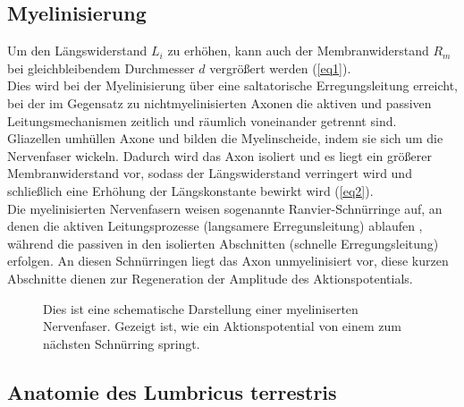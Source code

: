 \documentclass[11pt]{article}
\begin{document}
\subsection{Myelinisierung}
Um den Längswiderstand $L_i$ zu erhöhen, kann auch der Membranwiderstand $R_m$ bei gleichbleibendem Durchmesser $d$ vergrößert werden (\vref*{eq1}). \\
Dies wird bei der Myelinisierung über eine saltatorische Erregungsleitung erreicht, bei der im Gegensatz zu nichtmyelinisierten Axonen die aktiven und passiven Leitungsmechanismen zeitlich und räumlich voneinander getrennt sind. \\
Gliazellen umhüllen Axone und bilden die Myelinscheide, indem sie sich um die Nervenfaser wickeln. Dadurch wird das Axon isoliert und es liegt ein größerer Membranwiderstand vor, sodass der Längswiderstand verringert wird und schließlich eine Erhöhung der Längskonstante bewirkt wird (\vref*{eq2}). \\
Die myelinisierten Nervenfasern weisen sogenannte Ranvier-Schnürringe auf, an denen die aktiven Leitungsprozesse (langsamere Erregunsleitung) ablaufen , während die passiven in den isolierten Abschnitten (schnelle Erregungsleitung) erfolgen. An diesen Schnürringen liegt das Axon unmyelinisiert vor, diese kurzen Abschnitte dienen zur Regeneration der Amplitude des Aktionspotentials. \cite{physiologie}

\begin{figure}[H]
\caption{Dies ist eine schematische Darstellung einer myeliniserten Nervenfaser. Gezeigt ist, wie ein Aktionspotential von einem zum nächsten Schnürring \glqq springt\grqq{}. }
\label{myelin}
\end{figure}


\subsection{Anatomie des Lumbricus terrestris}
\end{document}
